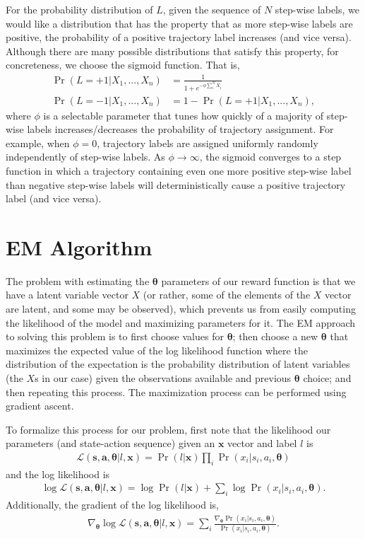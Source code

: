 \documentclass{article}
\begin{document}
For the probability distribution of $L$, given the sequence of $N$ step-wise labels, we would like a distribution that has the property that as more step-wise labels are positive, the probability of a positive trajectory label increases (and vice versa). Although there are many possible distributions that satisfy this property, for concreteness, we choose the sigmoid function. That is,
\begin{align}
\Pr(L = +1 | X_1, ..., X_n) &= \frac{1}{1 + e^{-\phi \sum_i^N X_i}} \\
\Pr(L = -1 | X_1, ... ,X_n) &= 1 - \Pr(L = +1 | X_1, ..., X_n),
\end{align}
where $\phi$ is a selectable parameter that tunes how quickly of a majority of step-wise labels increases/decreases the probability of trajectory assignment. For example, when $\phi = 0$, trajectory labels are assigned uniformly randomly independently of step-wise labels. As $\phi \rightarrow \infty$, the sigmoid converges to a step function in which a trajectory containing even one more positive step-wise label than negative step-wise labels will deterministically cause a positive trajectory label (and vice versa).

\section{EM Algorithm}
The problem with estimating the $\bm{\theta}$ parameters of our reward function is that we have a latent variable vector $X$ (or rather, some of the elements of the $X$ vector are latent, and some may be observed), which prevents us from easily computing the likelihood of the model and maximizing parameters for it. The EM approach to solving this problem is to first choose values for $\bm{\theta}$; then choose a new $\bm{\theta}$ that maximizes the expected value of the log likelihood function where the distribution of the expectation is the probability distribution of latent variables (the $X$s in our case) given the observations available and previous $\bm{\theta}$ choice; and then repeating this process. The maximization process can be performed using gradient ascent. 

To formalize this process for our problem, first note that the likelihood our parameters (and state-action sequence) given an $\bm{x}$ vector and label $l$ is
\begin{align}
\mathcal{L}(\bm{s}, \bm{a}, \bm{\theta} | l, \bm{x}) = \Pr(l | \bm{x}) \prod_i \Pr(x_i | s_i, a_i, \bm{\theta})
\end{align}
and the log likelihood is
\begin{align}
\log\mathcal{L}(\bm{s}, \bm{a}, \bm{\theta} | l, \bm{x}) = \log \Pr(l | \bm{x}) + \sum_i \log \Pr(x_i | s_i, a_i, \bm{\theta}).
\end{align}
Additionally, the gradient of the log likelihood is,
\begin{align}
\nabla_{\bm{\theta}} \log\mathcal{L}(\bm{s}, \bm{a}, \bm{\theta} | l, \bm{x}) = \sum_i  \frac{\nabla_{\bm{\theta}} \Pr(x_i | s_i, a_i, \bm{\theta})}{\Pr(x_i | s_i, a_i, \bm{\theta})}.
\end{align}
\end{document}
